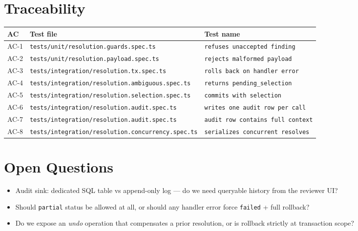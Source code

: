 \section{Traceability}

\begin{center}
\begin{tabular}{@{}lll@{}}
\toprule
AC & Test file & Test name \\
\midrule
AC-1 & \texttt{tests/unit/resolution.guards.spec.ts}       & \texttt{refuses unaccepted finding} \\
AC-2 & \texttt{tests/unit/resolution.payload.spec.ts}      & \texttt{rejects malformed payload} \\
AC-3 & \texttt{tests/integration/resolution.tx.spec.ts}    & \texttt{rolls back on handler error} \\
AC-4 & \texttt{tests/integration/resolution.ambiguous.spec.ts} & \texttt{returns pending\_selection} \\
AC-5 & \texttt{tests/integration/resolution.selection.spec.ts} & \texttt{commits with selection} \\
AC-6 & \texttt{tests/integration/resolution.audit.spec.ts} & \texttt{writes one audit row per call} \\
AC-7 & \texttt{tests/integration/resolution.audit.spec.ts} & \texttt{audit row contains full context} \\
AC-8 & \texttt{tests/integration/resolution.concurrency.spec.ts} & \texttt{serializes concurrent resolves} \\
\bottomrule
\end{tabular}
\end{center}

\section{Open Questions}
\begin{itemize}[leftmargin=1.2em]
  \item Audit sink: dedicated SQL table vs append-only log --- do we need queryable history from the reviewer UI?
  \item Should \texttt{partial} status be allowed at all, or should any handler error force \texttt{failed} + full rollback?
  \item Do we expose an \emph{undo} operation that compensates a prior resolution, or is rollback strictly at transaction scope?
\end{itemize}


